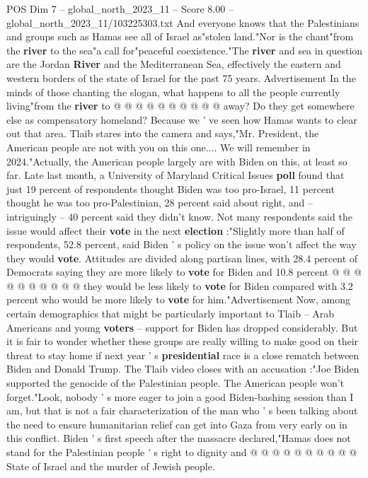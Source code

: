 \begin{textsample}{POS Dim 7 – global\_north\_2023\_11 – Score 8.00 – global\_north\_2023\_11/103225303.txt}
And everyone knows that the Palestinians and groups such as Hamas see all of Israel as"stolen land."Nor is the chant"from the \textbf{river} to the sea"a call for"peaceful coexistence."The \textbf{river} and sea in question are the Jordan \textbf{River} and the Mediterranean Sea, effectively the eastern and western borders of the state of Israel for the past 75 years.
Advertisement In the minds of those chanting the slogan, what happens to all the people currently living"from the \textbf{river} to @ @ @ @ @ @ @ @ @ @ away?
Do they get somewhere else as compensatory homeland?
Because we ' ve seen how Hamas wants to clear out that area.
Tlaib stares into the camera and says,"Mr.
President, the American people are not with you on this one....
We will remember in 2024."Actually, the American people largely are with Biden on this, at least so far.
Late last month, a University of Maryland Critical Issues \textbf{poll} found that just 19 percent of respondents thought Biden was too pro-Israel, 11 percent thought he was too pro-Palestinian, 28 percent said about right, and -- intriguingly -- 40 percent said they didn't know.
Not many respondents said the issue would affect their \textbf{vote} in the next \textbf{election} :"Slightly more than half of respondents, 52.8 percent, said Biden ' s policy on the issue won't affect the way they would \textbf{vote}.
Attitudes are divided along partisan lines, with 28.4 percent of Democrats saying they are more likely to \textbf{vote} for Biden and 10.8 percent @ @ @ @ @ @ @ @ @ @ they would be less likely to \textbf{vote} for Biden compared with 3.2 percent who would be more likely to \textbf{vote} for him."Advertisement Now, among certain demographics that might be particularly important to Tlaib -- Arab Americans and young \textbf{voters} -- support for Biden has dropped considerably.
But it is fair to wonder whether these groups are really willing to make good on their threat to stay home if next year ' s \textbf{presidential} race is a close rematch between Biden and Donald Trump.
The Tlaib video closes with an accusation :"Joe Biden supported the genocide of the Palestinian people.
The American people won't forget."Look, nobody ' s more eager to join a good Biden-bashing session than I am, but that is not a fair characterization of the man who ' s been talking about the need to ensure humanitarian relief can get into Gaza from very early on in this conflict.
Biden ' s first speech after the massacre declared,"Hamas does not stand for the Palestinian people ' s right to dignity and @ @ @ @ @ @ @ @ @ @ State of Israel and the murder of Jewish people.

\end{textsample}
